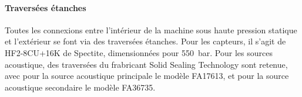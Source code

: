 \paragraph{Traversées étanches} Toutes les connexions entre l'intérieur de la machine sous haute pression statique et l'extérieur se font via des traversées étanches. Pour les capteurs, il s'agit de HF2-8CU+16K de Spectite, dimensionnées pour \qty{550}{\bar}. Pour les sources acoustique, des traversées du frabricant Solid Sealing Technology sont retenue, avec pour la source acoustique principale le modèle FA17613, et pour la source acoustique secondaire le modèle FA36735. 



%    


